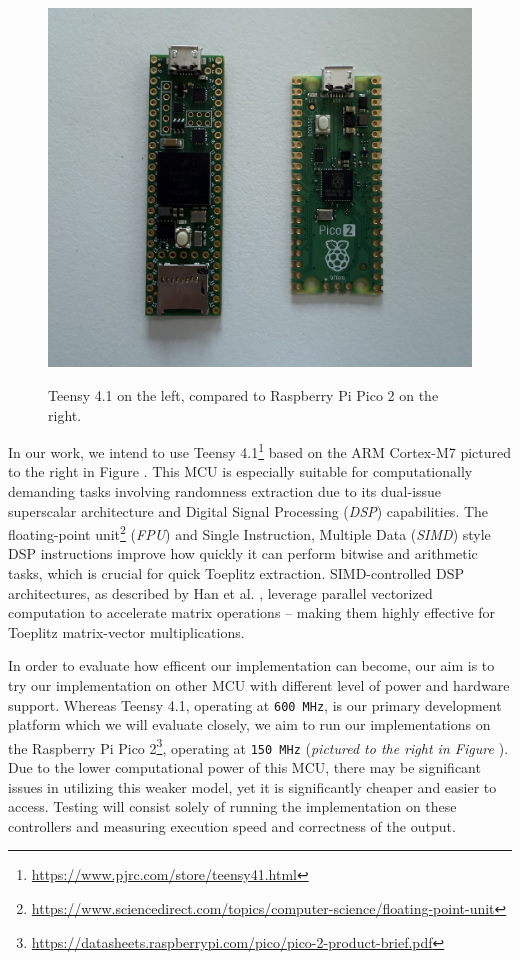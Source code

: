 \documentclass{sigchi}
\begin{document}
\begin{figure}
\centering
\includegraphics[width=1\linewidth,height=\textheight,keepaspectratio,alt={Teensy 4.1 on the left, compared to Raspberry Pi Pico 2 on the right.}]{img/mcu.jpeg}
\caption{Teensy 4.1 on the left, compared to Raspberry Pi Pico 2 on the right.}\label{fig:mcu}
\end{figure}

In our work, we intend to use Teensy 4.1\footnote{\url{https://www.pjrc.com/store/teensy41.html}} based on the ARM Cortex-M7 pictured to the right in Figure \cite{fig:mcu}. This MCU is especially suitable for computationally demanding tasks involving randomness extraction due to its dual-issue superscalar architecture and Digital Signal Processing (\emph{DSP}) capabilities. The floating-point unit\footnote{\url{https://www.sciencedirect.com/topics/computer-science/floating-point-unit}} (\emph{FPU}) and Single Instruction, Multiple Data (\emph{SIMD}) style DSP instructions improve how quickly it can perform bitwise and arithmetic tasks, which is crucial for quick Toeplitz extraction. SIMD-controlled DSP architectures, as described by Han et al. \cite{simd-dsp}, leverage parallel vectorized computation to accelerate matrix operations -- making them highly effective for Toeplitz matrix-vector multiplications.

In order to evaluate how efficent our implementation can become, our aim is to try our implementation on other MCU with different level of power and hardware support. Whereas Teensy 4.1, operating at \texttt{600\ MHz}, is our primary development platform which we will evaluate closely, we aim to run our implementations on the Raspberry Pi Pico 2\footnote{\url{https://datasheets.raspberrypi.com/pico/pico-2-product-brief.pdf}}, operating at \texttt{150\ MHz} (\emph{pictured to the right in Figure \cite{fig:mcu}}). Due to the lower computational power of this MCU, there may be significant issues in utilizing this weaker model, yet it is significantly cheaper and easier to access. Testing will consist solely of running the implementation on these controllers and measuring execution speed and correctness of the output.
\end{document}
